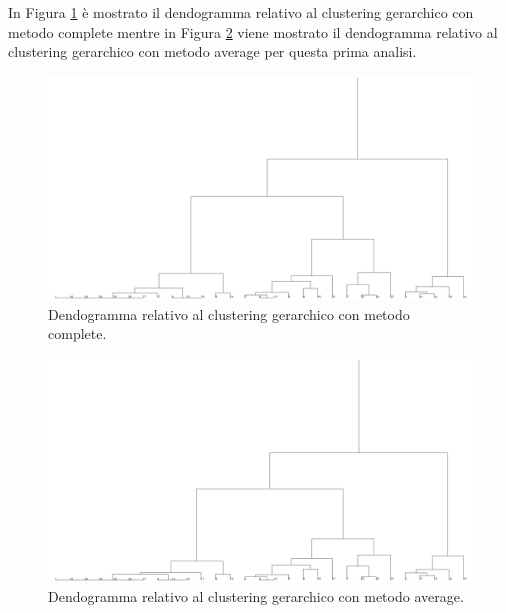 \documentclass[12pt]{article}
\begin{document}
In Figura \ref{fig:dendo-complete} è mostrato il dendogramma relativo al clustering gerarchico con metodo complete mentre in Figura \ref{fig:dendo-average} viene mostrato il dendogramma relativo al clustering gerarchico con metodo average per questa prima analisi.
\begin{figure}[H]
	\includegraphics[width=\textwidth]{img/hierarchical-complete.png}
	\caption{Dendogramma relativo al clustering gerarchico con metodo complete.}
	\label{fig:dendo-complete}
\end{figure}
\begin{figure}[H]
	\includegraphics[width=\textwidth]{img/hierarchical-average.png}
	\caption{Dendogramma relativo al clustering gerarchico con metodo average.}
	\label{fig:dendo-average}
\end{figure}

\end{document}
